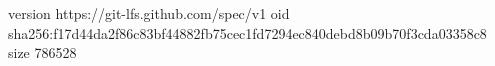 version https://git-lfs.github.com/spec/v1
oid sha256:f17d44da2f86c83bf44882fb75cec1fd7294ec840debd8b09b70f3cda03358c8
size 786528
